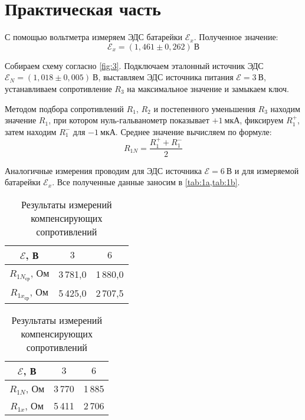 \section{Практическая часть}

С помощью вольтметра измеряем ЭДС батарейки $\mathcal{E}_x$. Полученное значение:
\[
\mathcal{E}_x = (1{,}461 \pm 0{,}262)\ \text{В}
\]

Собираем схему согласно \cref{fig:3}. Подключаем эталонный источник ЭДС $\mathcal{E}_N = (1{,}018 \pm 0{,}005)\ \text{В}$, выставляем ЭДС источника питания $\mathcal{E} = 3\ \text{В}$, устанавливаем сопротивление $R_3$ на максимальное значение и замыкаем ключ.

Методом подбора сопротивлений $R_1$, $R_2$ и постепенного уменьшения $R_3$ находим значение $R_1$, при котором нуль-гальванометр показывает $+1\ \text{мкА}$, фиксируем $R_1^+$, затем находим $R_1^-$ для $-1\ \text{мкА}$. Среднее значение вычисляем по формуле:
\[
R_{1N} = \frac{R_1^+ + R_1^-}{2}
\]

Аналогичные измерения проводим для ЭДС источника $\mathcal{E} = 6\ \text{В}$ и для измеряемой батарейки $\mathcal{E}_x$. Все полученные данные заносим в \cref{tab:1a,tab:1b}.

\begin{table}[h!]
	\centering
	\caption{Результаты измерений компенсирующих сопротивлений}
	\label{tab:1}
	
	\begin{minipage}{0.45\textwidth}
		\centering
		\label{tab:1a}
		\begin{tabular}{ccc}
			\toprule
			$\mathcal{E}$, В & $3$ & $6$ \\
			\midrule
			$R_{1N_{\text{ср}}}$, Ом & 3\,781,0 & 1\,880,0 \\
			$R_{1x_{\text{ср}}}$, Ом & 5\,425,0 & 2\,707,5 \\
			\bottomrule
		\end{tabular}
	\end{minipage}
	\hfill
	\begin{minipage}{0.45\textwidth}
		\centering
		\label{tab:1b}
		\begin{tabular}{ccc}
			\toprule
			$\mathcal{E}$, В & $3$ & $6$ \\
			\midrule
			$R_{1N}$, Ом & 3\,770 & 1\,885 \\
			$R_{1x}$, Ом & 5\,411 & 2\,706 \\
			\bottomrule
		\end{tabular}
	\end{minipage}
\end{table}

